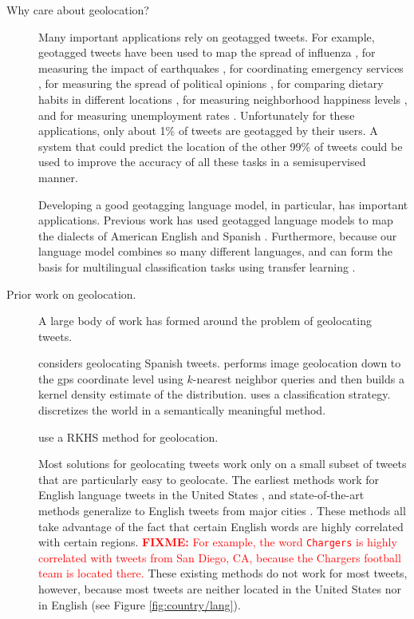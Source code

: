 \documentclass[sigconf,10pt]{acmart}
\newcommand{\str}[1]{\texttt{#1}}
\newcommand{\fixme}[1]{\textcolor{red}{\textbf{FIXME:} {#1}}}
\begin{document}
\begin{description}
\item[Why care about geolocation?]
Many important applications rely on geotagged tweets.
For example, geotagged tweets have been used to map the spread of influenza \citep{paul2014twitter,santillana2015combining},
for measuring the impact of earthquakes \citep{sakaki2010earthquake},
for coordinating emergency services \citep{klein2012detection,imran2016twitter,rudra2016summarizing,pohl2016online},
for measuring the spread of political opinions \citep{conover2011political,barbera2014birds},
for comparing dietary habits in different locations \citep{widener2014using},
for measuring neighborhood happiness levels \citep{nguyen2016leveraging}, 
and for measuring unemployment rates \citep{antenucci2014using,llorente2015social}.
Unfortunately for these applications, only about 1\% of tweets are geotagged by their users.
A system that could predict the location of the other 99\% of tweets could be used to improve the accuracy of all these tasks in a semisupervised manner.

Developing a good geotagging language model, in particular, has important applications.
Previous work has used geotagged language models to map the dialects of American English \citep{huang2016understanding,gonccalves2017fall} and Spanish \citep{gonccalves2014crowdsourcing}.
Furthermore, because our language model combines so many different languages,
and can form the basis for multilingual classification tasks using transfer learning \citep{wang2015transfer,howard2018fine}.

\item[Prior work on geolocation.]
A large body of work has formed around the problem of geolocating tweets.

\citet{maier2014language} considers geolocating Spanish tweets.
\citet{hays2008im2gps} performs image geolocation down to the gps coordinate level using $k$-nearest neighbor queries and then builds a kernel density estimate of the distribution.
\citet{crandall2009mapping} uses a classification strategy.
\citet{weyand2016planet} discretizes the world in a semantically meaningful method.

\citet{nguyen2017kernel} use a RKHS method for geolocation.

Most solutions for geolocating tweets work only on a small subset of tweets that are particularly easy to geolocate.
The earliest methods work for English language tweets in the United States \citep{},
and state-of-the-art methods generalize to English tweets from major cities \citep{}.
These methods all take advantage of the fact that certain English words are highly correlated with certain regions.
\fixme{For example, the word \str{Chargers} is highly correlated with tweets from San Diego, CA,
because the Chargers football team is located there.}
These existing methods do not work for most tweets, however,
because most tweets are neither located in the United States nor in English (see Figure \ref{fig:country/lang}).


\end{description}
\end{document}
